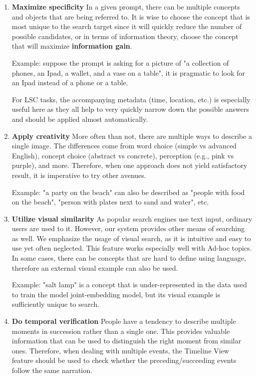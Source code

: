 \begin{enumerate}
    \item \textbf{Maximize specificity} \quad In a given prompt, there can be multiple concepts and objects that are being referred to. It is wise to choose the concept that is most unique to the search target since it will quickly reduce the number of possible candidates, or in terms of information theory, choose the concept that will maximize \textbf{information gain}.
    
    Example: suppose the prompt is asking for a picture of "a collection of phones, an Ipad, a wallet, and a vase on a table", it is pragmatic to look for an Ipad instead of a phone or a table. 
    
    For LSC tasks, the accompanying metadata (time, location, etc.) is especially useful here as they all help to very quickly narrow down the possible answers and should be applied almost automatically. 
    
    \item \textbf{Apply creativity} \quad More often than not, there are multiple ways to describe a single image. The differences come from word choice (simple vs advanced English), concept choice (abstract vs concrete), perception (e.g., pink vs purple), and more. Therefore, when one approach does not yield satisfactory result, it is imperative to try other avenues.
    
    Example: "a party on the beach" can also be described as "people with food on the beach", "person with plates next to sand and water", etc. 
    
    \item \textbf{Utilize visual similarity} \quad As popular search engines use text input, ordinary users are used to it. However, our system provides other means of searching as well. We emphasize the usage of visual search, as it is intuitive and easy to use yet often neglected. This feature works especially well with Ad-hoc topics. In some cases, there can be concepts that are hard to define using language, therefore an external visual example can also be used.
    
    Example: "salt lamp" is a concept that is under-represented in the data used to train the model joint-embedding model, but its visual example is sufficiently unique to search.
    
    \item \textbf{Do temporal verification} \quad People have a tendency to describe multiple moments in succession rather than a single one. This provides valuable information that can be used to distinguish the right moment from similar ones. Therefore, when dealing with multiple events, the Timeline View feature should be used to check whether the preceding/succeeding events follow the same narration. 
\end{enumerate}